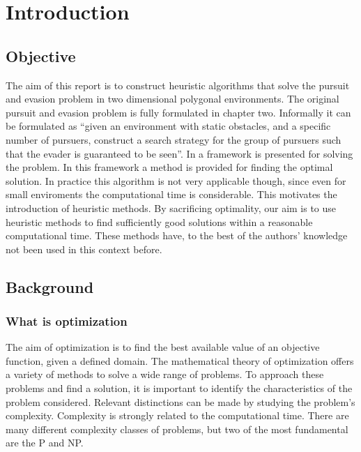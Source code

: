 \chapter{Introduction}

\section{Objective}
The aim of this report is to construct heuristic algorithms that solve the pursuit and evasion problem in two dimensional polygonal environments. The original pursuit and evasion problem is fully formulated in chapter two. Informally it can be formulated as ``given an environment with static obstacles, and a specific number of pursuers, construct a search strategy for the group of pursuers such that the evader is guaranteed to be seen''. In \cite{paper3} a framework is presented for solving the problem. In this framework a method is provided for finding the optimal solution. In practice this algorithm is not very applicable though, since even for small enviroments the computational time is considerable. This motivates the introduction of heuristic methods. By sacrificing optimality, our aim is to use heuristic methods to find sufficiently good solutions within a reasonable computational time. These methods have, to the best of the authors' knowledge not been used in this context before.
\section{Background}
\subsection{What is optimization}
The aim of optimization is to find the best available value of an objective function, given a defined domain. %
The mathematical theory of optimization offers a variety of methods to solve a wide range of problems. To approach these problems and find a solution, it is important to identify the characteristics of the problem considered. Relevant distinctions can be made by studying the problem's complexity. Complexity is strongly related to the computational time. There are many different complexity classes of problems, but two of the most fundamental are the P and NP.


